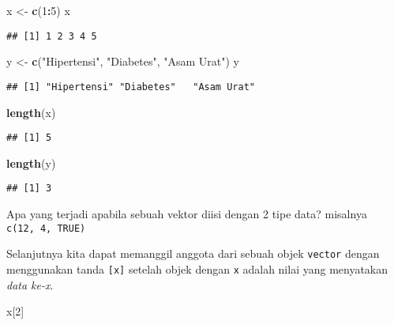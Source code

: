 \documentclass[
]{book}
\newenvironment{Shaded}{\begin{snugshade}}{\end{snugshade}}
\newcommand{\DecValTok}[1]{\textcolor[rgb]{0.00,0.00,0.81}{#1}}
\newcommand{\KeywordTok}[1]{\textcolor[rgb]{0.13,0.29,0.53}{\textbf{#1}}}
\newcommand{\NormalTok}[1]{#1}
\newcommand{\OperatorTok}[1]{\textcolor[rgb]{0.81,0.36,0.00}{\textbf{#1}}}
\newcommand{\StringTok}[1]{\textcolor[rgb]{0.31,0.60,0.02}{#1}}
\begin{document}
\begin{Shaded}
\begin{Highlighting}[]
\NormalTok{x <-}\StringTok{ }\KeywordTok{c}\NormalTok{(}\DecValTok{1}\OperatorTok{:}\DecValTok{5}\NormalTok{)}
\NormalTok{x}
\end{Highlighting}
\end{Shaded}

\begin{verbatim}
## [1] 1 2 3 4 5
\end{verbatim}

\begin{Shaded}
\begin{Highlighting}[]
\NormalTok{y <-}\StringTok{ }\KeywordTok{c}\NormalTok{(}\StringTok{"Hipertensi"}\NormalTok{, }\StringTok{"Diabetes"}\NormalTok{, }\StringTok{"Asam Urat"}\NormalTok{)}
\NormalTok{y}
\end{Highlighting}
\end{Shaded}

\begin{verbatim}
## [1] "Hipertensi" "Diabetes"   "Asam Urat"
\end{verbatim}

\begin{Shaded}
\begin{Highlighting}[]
\KeywordTok{length}\NormalTok{(x)}
\end{Highlighting}
\end{Shaded}

\begin{verbatim}
## [1] 5
\end{verbatim}

\begin{Shaded}
\begin{Highlighting}[]
\KeywordTok{length}\NormalTok{(y)}
\end{Highlighting}
\end{Shaded}

\begin{verbatim}
## [1] 3
\end{verbatim}

Apa yang terjadi apabila sebuah vektor diisi dengan 2 tipe data? misalnya \texttt{c(12,\ 4,\ TRUE)}

Selanjutnya kita dapat memanggil anggota dari sebuah objek \texttt{vector} dengan menggunakan tanda \texttt{{[}x{]}} setelah objek dengan \texttt{x} adalah nilai yang menyatakan \emph{data ke-x}.

\begin{Shaded}
\begin{Highlighting}[]
\NormalTok{x[}\DecValTok{2}\NormalTok{]}
\end{Highlighting}
\end{Shaded}
\end{document}
